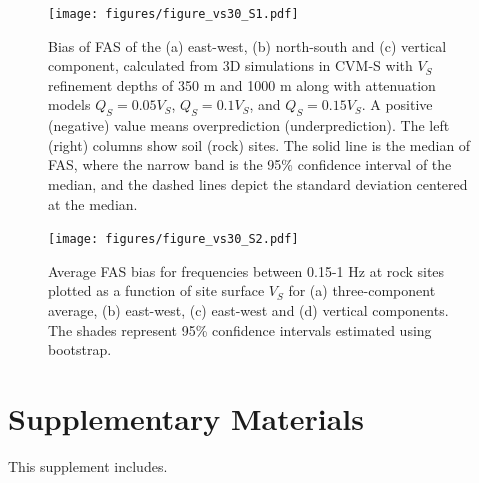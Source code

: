\clearpage
\begin{figure}[!ht]
  \centering
  \texttt{[image: figures/figure\_vs30\_S1.pdf]}
  \caption{Bias of FAS of the (a) east-west, (b) north-south and (c) vertical component, calculated from 3D simulations in CVM-S with $V_S$ refinement depths of 350 m and 1000 m along with attenuation models $Q_S=0.05V_S$, $Q_S=0.1V_S$, and $Q_S=0.15V_S$. A positive (negative) value means overprediction (underprediction). The left (right) columns show soil (rock) sites. The solid line is the median of FAS, where the narrow band is the 95\% confidence interval of the median, and the dashed lines depict the standard deviation centered at the median.}
  \label{fig:vs30-S1}
\end{figure}

\clearpage
\begin{figure}[!ht]
  \centering
  \texttt{[image: figures/figure\_vs30\_S2.pdf]}
  \caption{Average FAS bias for frequencies between 0.15-1 Hz at rock sites plotted as a function of site surface $V_S$ for (a) three-component average, (b) east-west, (c) east-west and (d) vertical components. The shades represent 95\% confidence intervals estimated using bootstrap.}
  \label{fig:vs30-S2}
\end{figure}

\setcounter{table}{0}
\setcounter{figure}{0}
\renewcommand{\thetable}{S\arabic{chapter}.\arabic{table}}
\renewcommand{\thefigure}{S\arabic{chapter}.\arabic{figure}}
\newpage
\section*{Supplementary Materials}

This supplement includes.




\renewcommand{\thetable}{\arabic{table}}
\renewcommand{\thefigure}{\arabic{figure}}


